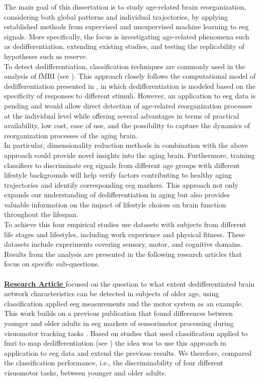 The main goal of this dissertation is to study age-related brain reorganization, considering both global patterns and individual trajectories, by applying established methods from supervised and unsupervised machine learning to \gls{eeg} signals. More specifically, the focus is investigating age-related phenomena such as dedifferentiation, extending existing studies, and testing the replicability of hypotheses such as reserve.\\
To detect dedifferentiation, classification techniques are commonly used in the analysis of fMRI (see ). This approach closely follows the computational model of dedifferentiation presented in , in which dedifferentiation is modeled based on the specificity of responses to different stimuli. However, an application to \gls{eeg} data is pending and would allow direct detection of age-related reorganization processes at the individual level while offering several advantages in terms of practical availability, low cost, ease of use, and the possibility to capture the dynamics of reorganization processes of the aging brain.\\
In particular, dimensionality reduction methods in combination with the above approach could provide novel insights into the aging brain. Furthermore, training classifiers to discriminate \gls{eeg} signals from different age groups with different lifestyle backgrounds will help verify factors contributing to healthy aging trajectories and identify corresponding \gls{eeg} markers. This approach not only expands our understanding of dedifferentiation in aging but also provides valuable information on the impact of lifestyle choices on brain function throughout the lifespan.\\
To achieve this four empirical studies use datasets with subjects from different life stages and lifestyles, including work experience and physical fitness. These datasets include experiments covering sensory, motor, and cognitive domains. Results from the analysis are presented in the following research articles that focus on specific sub-questions.\\
\\
\textbf{\hyperref[pub:paperI]{Research Article }} focused on the question to what extent dedifferentiated brain network characteristics can be detected in subjects of older age, using classification applied \gls{eeg} measurements and the motor system as an example. This work builds on a previous publication that found differences between younger and older adults in \gls{eeg} markers of sensorimotor processing during visuomotor tracking tasks \cite{vieluf2018age}. Based on studies that used classification applied to \gls{fmri} to map dedifferentiation (see ) the idea was to use this approach in application to \gls{eeg} data and extend the previous results. We therefore, compared the classification performance, i.e., the discriminability of four different visuomotor tasks, between younger and older adults.\\
